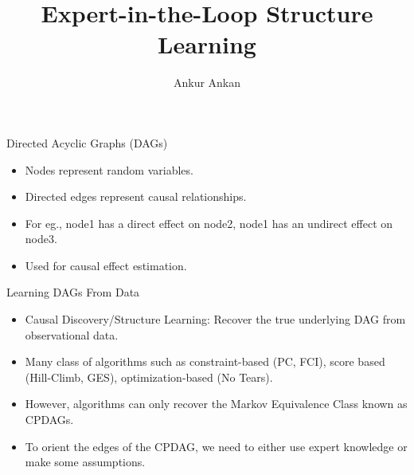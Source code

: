 \documentclass{beamer}
\begin{document}
\title[]{Expert-in-the-Loop Structure Learning}
\author{Ankur Ankan}
\date{}

\maketitle

\begin{frame}{Directed Acyclic Graphs (DAGs)}
	
	\begin{itemize}
		\item Nodes represent random variables.
		\item Directed edges represent causal relationships.
		\item For eg., node1 has a direct effect on node2, node1 has an undirect effect on node3.
		\item Used for causal effect estimation.
	\end{itemize}
\end{frame}

\begin{frame}{Learning DAGs From Data}
	\begin{figure}
		\centering
	\end{figure}

	\begin{itemize}
		\item Causal Discovery/Structure Learning: Recover the true underlying DAG from observational data.
		\item Many class of algorithms such as constraint-based (PC, FCI), score based (Hill-Climb, GES), optimization-based (No Tears).
		\item However, algorithms can only recover the Markov Equivalence Class known as CPDAGs.
		\item To orient the edges of the CPDAG, we need to either use expert knowledge or make some assumptions.
	\end{itemize}
\end{frame}
\end{document}
